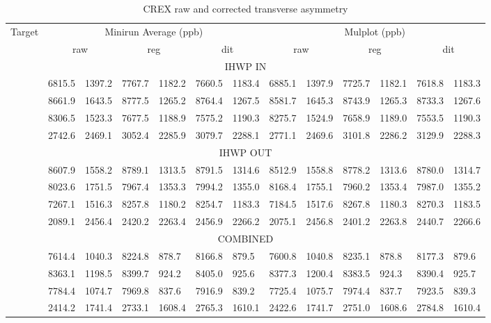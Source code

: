 \begin{table}[!h]
    \scriptsize
    \begin{tabular}{c | r@{ $\pm$ }l r@{ $\pm$ }l r@{ $\pm$ }l | r@{ $\pm$ }l r@{ $\pm$ }l r@{ $\pm$ }l}
	\hline
	\multirow{2}{*}{Target}	& \multicolumn{6}{c|}{Minirun Average (ppb)} & \multicolumn{6}{c}{Mulplot (ppb)}	\\
	\cline{2-13}
	    & \multicolumn{2}{c}{raw}   & \multicolumn{2}{c}{reg}	& \multicolumn{2}{c|}{dit}   & \multicolumn{2}{c}{raw}	& \multicolumn{2}{c}{reg}   & \multicolumn{2}{c}{dit}	\\
	\hline
	\multicolumn{13}{c}{IHWP IN}   \\
	\hline
	\C	& 6815.5    & 1397.2	& 7767.7    & 1182.2	& 7660.5    & 1183.4	& 6885.1    & 1397.9	& 7725.7    & 1182.1	& 7618.8 & 1183.3	\\ 
	\ca     & 8661.9    & 1643.5	& 8777.5    & 1265.2	& 8764.4    & 1267.5	& 8581.7    & 1645.3	& 8743.9    & 1265.3	& 8733.3 & 1267.6	\\ 
	\Ca     & 8306.5    & 1523.3   	& 7677.5    & 1188.9	& 7575.2    & 1190.3	& 8275.7    & 1524.9	& 7658.9    & 1189.0	& 7553.5 & 1190.3	\\ 
	\Pb	& 2742.6    & 2469.1   	& 3052.4    & 2285.9	& 3079.7    & 2288.1	& 2771.1    & 2469.6	& 3101.8    & 2286.2	& 3129.9 & 2288.3	\\ 
	\hline
	\multicolumn{13}{c}{IHWP OUT}   \\
	\hline
	\C	& 8607.9	& 1558.2    & 8789.1	& 1313.5    & 8791.5	& 1314.6    & 8512.9    & 1558.8	& 8778.2    & 1313.6	& 8780.0    & 1314.7	\\      
	\ca      & 8023.6	& 1751.5    & 7967.4	& 1353.3    & 7994.2	& 1355.0    & 8168.4    & 1755.1	& 7960.2    & 1353.4	& 7987.0    & 1355.2	\\      
	\Ca      & 7267.1	& 1516.3    & 8257.8	& 1180.2    & 8254.7	& 1183.3    & 7184.5    & 1517.6	& 8267.8    & 1180.3	& 8270.3    & 1183.5	\\      
	\Pb	& 2089.1	& 2456.4    & 2420.2	& 2263.4    & 2456.9	& 2266.2    & 2075.1    & 2456.8	& 2401.2    & 2263.8	& 2440.7    & 2266.6	\\      
	\hline
	\multicolumn{13}{c}{COMBINED}   \\
	\hline
	\C	& 7614.4	& 1040.3    & 8224.8	& 878.7     & 8166.8	& 879.5	    & 7600.8    & 1040.8	& 8235.1    & 878.8 	& 8177.3    & 879.6	\\      
	\Ca      & 8363.1	& 1198.5    & 8399.7	& 924.2     & 8405.0	& 925.6	    & 8377.3    & 1200.4	& 8383.5    & 924.3 	& 8390.4    & 925.7 	\\        
	\Ca  	& 7784.4	& 1074.7    & 7969.8	& 837.6     & 7916.9	& 839.2	    & 7725.4    & 1075.7	& 7974.4    & 837.7 	& 7923.5    & 839.3 	\\        
	\Pb      & 2414.2	& 1741.4    & 2733.1	& 1608.4    & 2765.3	& 1610.1    & 2422.6    & 1741.7	& 2751.0    & 1608.6	& 2784.8    & 1610.4	\\        
	\hline
    \end{tabular}
    \caption{CREX raw and corrected transverse asymmetry}
\end{table}


